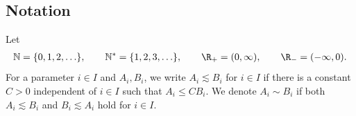 \subsection{Notation}
Let
\begin{align*}
\mathbb{N}=\{0,1,2,\hdots\},\qquad \mathbb{N}^*=\{1,2,3,\hdots\}, \qquad \R_{+}=(0,\infty),\qquad \R_-=(-\infty,0).
\end{align*}
For a parameter $i\in I$ and $A_i,B_i$, we write $A_i\lesssim B_i$ for $i\in I$ if there is a constant $C>0$ independent of $i\in I$ such that $A_i\leq CB_i$. We denote $A_i\sim B_i$ if both $A_i\lesssim B_i$ and $B_i\lesssim A_i$ hold for $i\in I$.
